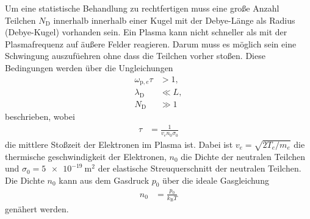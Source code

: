 Um eine statistische Behandlung zu rechtfertigen muss eine gro\ss e Anzahl Teilchen $N_\text{D}$ innerhalb innerhalb einer Kugel mit der Debye-L\"ange als Radius (Debye-Kugel) vorhanden sein.
Ein Plasma kann nicht schneller als mit der Plasmafrequenz auf \"au\ss ere Felder reagieren.
Darum muss es m\"oglich sein eine Schwingung auszuf\"uehren ohne dass die Teilchen vorher sto\ss en.
\cite{stroth11a}
Diese Bedingungen werden \"uber die Ungleichungen
\begin{align}
\omega_{\text{p},e}\tau
&>1,
\label{eq:c1}\\
\lambda_\text{D}
&\ll L,
\label{eq:c2}\\
N_\text{D}
&\gg 1
\label{eq:c3}
\end{align}
beschrieben, wobei
\begin{align}
\tau
    &=\frac{1}{v_en_0\sigma_0}
    \label{eq:tau}
\end{align}
die mittlere Sto\ss zeit der Elektronen im Plasma ist.
Dabei ist $v_e=\sqrt{2T_e/m_e}$ die thermische geschwindigkeit der Elektronen, $n_0$ die Dichte der neutralen Teilchen und $\sigma_0=\SI{5e-19}{\metre\squared}$ der elastische Streuquerschnitt der neutralen Teilchen.
Die Dichte $n_0$ kann aus dem Gasdruck $p_0$ \"uber die ideale Gasgleichung
\begin{align}
n_0
    &=\frac{p_0}{k_\text{B}T}
    \label{eq:n0}
\end{align}
gen\"ahert werden.
\cite{anleitung2}

